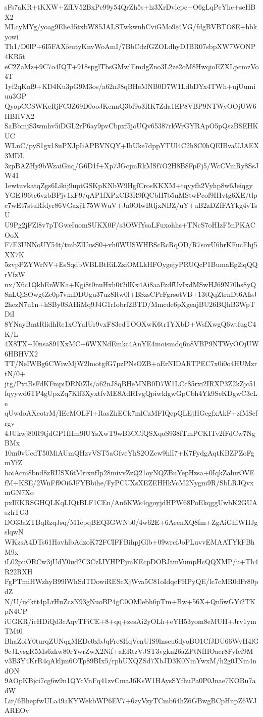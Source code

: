 sFs7aKR+tKXW+ZfLV52BxPc99y54QrZh5s+lz3XrDvlcpc+O6gLqPcYhc+seHBX2
MLcyMYg/yoag9Ehe35txbW85JALSTwkwnhCviGMo9e4VG/fdgBVBTO8E+hbkyowi
Th1/D0lP+6I5FAXfeutyKnvWoAmI/7BbCdzfGZOLdhyDJBR07sbpXW7WONP4KR5t
eC2ZaMz+9C7o4IQT+918spglTbsGMwlEmdgZno3L2ze2oM8HwqioEZXLpcmzVo4T
1yf2qKnf9+KD4Ku3pG9M3os/a62nJ8qBHeMNB0D7W1LdbDYx4TWh+ujUumiuu3GP
QyopCCSWKeRjFC3Z69D0ooJKcnnQ3bf9o3RK7Zda1EP8VBP9NTWyOOjUW6HBHVX2
SaBbmjS3wmhv5iDGL2rP6ay9pvCbpxf5joUQv65387rkWrGYRApO5pQszBSEHKUC
WLnC/pyS1gx18uPXJpIiAPBVNQY+IhUke7dppYTUl4C2h8C0hQEIBvaUJAEX3MDL
3zpBAZHy9bWzaiGnq/G6D1f+Xp7JGcjmRkMSf7O2H8B8FpFj5/WcCVmRy8SsJW41
1ewtuvkatqZgs6Likij9uptGSKpKNbW9HgfCrosKKXM+tqyyfh2Vyhp8w6Jeiqgy
YGEJ96tc6vzbBPjv1xF9/qAP1fXPxCB3R9fQCbH7b5nMStwPcof9IHvtg6XE/tlp
c7wEt7stuRfdyr86VGazjT75WWuV+Jn0OlwBtljxNBZ/uY+uB2zDZfFAYkg4vTsU
U9Pg2jFZl8v7pTGweIuomSUKX0F/s3OWfYsaLFuxohhs+TNcS7oHIzF5nPKACOoX
F7E3UNNoUY54t/tmbZlUusS0+vh0WUSWHBScRcRqOD/R7sovU6hrKFucEhj5XX7K
5zvpPZYWrNV+EsSqdbWBLBtEiLZziOMLkHFOygejyPRUQcP1BumaEg2iqQQrVfzW
nx/X6c1QkhEnWKa+Kgi8t0nuHxh0t2ilKx4Ai8aaFzdfUvIxdMSwHJ69N70hs8yQ
8nLQlSOwgtZc0p7vmDDUgu37uz8Rw0l+BSzsCPrFgrsotVB+13tQqZtrnDt6AIsJ
2hezN7u1n+hSBy0SAHiMq9J4G1rIobrf2BTD/Mmcde6pXgeajBU26BQhB3WpTDiI
8YNayBmtRlidhRe1xCYaIUr9vxF83cdTOOXwK6tr1YXbD+WsfXwgQ6wtfugC4K/L
4X8TX+I0nsa891XxMC+6WXNdEmkc4AnYE4moismdq6n8VBP9NTWyOOjUW6HBHVX2
TT/NeIWBg6CWiwMjW2lmotgfG7pzPNsOZB+aErNIDARTPEC7x0i0o4HUMzrtN/0+
jtg/PxtBsFdKFmpiDRNiZIs/a62nJ8qBHeMNB0D7W1LCc85rxi2IRXP3Z2kZjc51
fqyywd6TP4gUpxZq7Klf3XyxtfvME8AdRIvgQpiwklgwGpCbh4Yk9SeKDgwC3cLe
qUwdoAXeotrM/IEeMOLFl+RasZhECk7mlCzMFIQcpQLEjHGegfxAkF+zfMSefrgv
4JUkwj80R9tjdGP1fHm9lUYsXwT9wB3CCfQSXqoS938fTmPCKITv2fFdCw7NgBMx
10m0vUcdT50MiAUmQHzvVST5aGfveYhS2OZcw9hlI7+K7FydgAqtKBZPZoFgmYfZ
hoiAcm8bnd8zRUSX6tMrixnfIp28mivvZzQ21oyNQZBuYepHzsa+0IqkZalurOVE
fM+KSE/2WnFf9Oi6JFYBbihe/FyPCUXsXEZEHHkVcM2Nygm9R/SbLRJQvxmGN7Xo
pxIEKRSGHQLKqLIQtBLF1CEn/An6KWs4qgoyjdHPW68PoEkqggUwbK2GUAszhTG3
DO33aZTBqRzqJsq/M1epqBEQ3GWNb0/4w62E+6AeenXQ8fm+ZgAiGhiWHJgslqwN
WKzsA4DTs61HavhlbAdzoK72FCIFFBihpjGlb+09wrcfJoPLuvvEMAATYkFBhM9x
iL02puORCw3jUdY0ud2C3CzIJYHPPjmKEcpDOBJtmVumpHcQQXMP/u+Th4R22RXH
FgPTmiHWzhyB99lWhSdTDowiREScXjWva5C81oIdqcFHPyQE/lc7cMR0dFr80pdZ
N/U/udktt4pLrHuZczN93gNuoBP4gC0OMlebh6pTm+Bw+56X+Qn5wGYi2TKpN4CP
iUGKR/icHDiQd3cAqvTFiCE+8+qq+zesAi2yOLh+eYH53yom8eMUH+Jrv1ymTMt0
BhaZoiY0turqZUNqgMEDc0xbJqFre8HqVcnUIS9lnscu6dyoBO1CfJDU66WvH4lG
9cJLysgR5Ms6zkw80rYwrZwX2Nif+aERtzVJST3vgkn26aZPtNfHOacr8Fvfcf9M
v3B3Y4KrR4qAkljm6OTp89BIx5/rphUXQZSd7XbJD3K0NinYwxM/h2g0JNm4ndON
9AOpKBjci7cg6w9n1QYcVnFq41zvCmaJ6KsW1HAysSYfhuPa0P0Jnae7KOBu7adW
Lir/6BhepfwULa49aKYWekbWP6EV7+6zyVzyTCmb64hZ6GBwgBCpHupZ6WJAREOv
